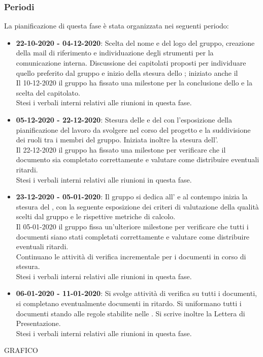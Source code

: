 \subsubsection{Periodi}
La pianificazione di questa fase è stata organizzata nei seguenti periodo:
\begin{itemize}
\item \textbf{22-10-2020 - 04-12-2020}: Scelta del nome e del logo del gruppo, creazione della mail di riferimento e individuazione degli strumenti per la comunicazione interna. Discussione dei capitolati proposti per individuare quello preferito dal gruppo e inizio della stesura dello \SdF{} ; iniziato anche il \Glossario \\Il 10-12-2020 il gruppo ha fissato una milestone\glo{} per la conclusione dello \SdF{} e la scelta del capitolato.\\Stesi i verbali interni relativi alle riunioni in questa fase.
\item \textbf{05-12-2020 - 22-12-2020}: Stesura delle \NdP{} e del \PdP{} con l'esposizione della pianificazione del lavoro da svolgere nel corso del progetto e la suddivisione dei ruoli tra i membri del gruppo. Iniziata inoltre la stesura dell'\AdR{}.\\Il 22-12-2020 il gruppo ha fissato una milestone per verificare che il documento \NdP{} sia completato correttamente e valutare come distribuire eventuali ritardi.\\Stesi i verbali interni relativi alle riunioni in questa fase.
\item \textbf{23-12-2020 - 05-01-2020}: Il gruppo si dedica all'\AdR{} e al contempo inizia la stesura del \PdQ{}, con la seguente esposizione dei criteri di valutazione della qualità scelti dal gruppo e le rispettive metriche\glo{} di calcolo.\\Il 05-01-2020 il gruppo fissa un'ulteriore milestone per verificare che tutti i documenti siano stati completati correttamente e valutare come distribuire eventuali ritardi.\\Continuano le attività di verifica incrementale per i documenti in corso di stesura.\\Stesi i verbali interni relativi alle riunioni in questa fase.
\item \textbf{06-01-2020 - 11-01-2020}: Si svolge attività di verifica su tutti i documenti, si completano eventualmente documenti in ritardo. Si uniformano tutti i documenti stando alle regole stabilite nelle \NdP{}. Si scrive inoltre la Lettera di Presentazione.\\Stesi i verbali interni relativi alle riunioni in questa fase.
\end{itemize}

GRAFICO